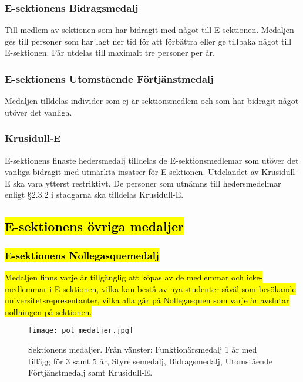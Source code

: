 \documentclass[../_main/handlingar.tex]{subfiles}
\begin{document}
\subsubsection*{E-sektionens Bidragsmedalj}
Till medlem av sektionen som har bidragit med något till E-sektionen. Medaljen ges till personer som har lagt ner tid för att förbättra eller ge tillbaka något till E-sektionen. Får utdelas till maximalt tre personer per år.

\subsubsection*{E-sektionens Utomstående Förtjänstmedalj}
Medaljen tilldelas individer som ej är sektionsmedlem och som har bidragit något utöver det vanliga.

\subsubsection*{Krusidull-E}
E-sektionens finaste hedersmedalj tilldelas de E-sektionsmedlemar som utöver det vanliga bidragit med utmärkta insatser för E-sektionen. Utdelandet av Krusidull-E ska vara ytterst restriktivt. De personer som utnämns till hedersmedelmar enligt §2.3.2 i stadgarna ska tilldelas Krusidull-E.

\subsection*{\hl{E-sektionens övriga medaljer}}
\subsubsection*{\hl{E-sektionens Nollegasquemedalj}}
\hl{Medaljen finns varje år tillgänglig att köpas av de medlemmar och icke-medlemmar i E-sektionen, vilka kan bestå av nya studenter såväl som besökande universitetsrepresentanter, vilka alla går på Nollegasquen som varje år avslutar nollningen på sektionen.}

\begin{figure}[H]
\begin{center}
    \texttt{[image: pol\_medaljer.jpg]}\\
\end{center}
{Sektionens medaljer. Från vänster: Funktionärsmedalj 1 år med tillägg för 3 samt 5 år, Styrelsemedalj, Bidragsmedalj, Utomstående Förtjänstmedalj samt Krusidull-E.}
\end{figure}

\changenote
\end{document}
